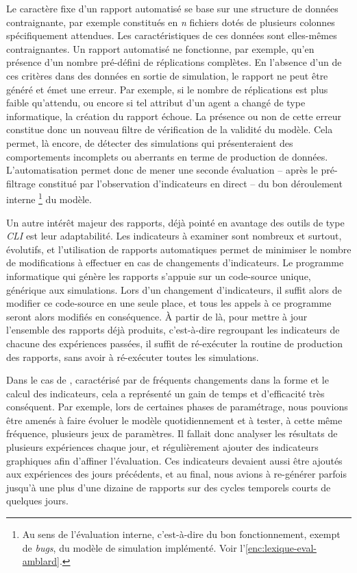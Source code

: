Le caractère fixe d'un rapport automatisé se base sur une structure de données contraignante, par exemple constitués en \textit{n} fichiers dotés de plusieurs colonnes spécifiquement attendues.
Les caractéristiques de ces données sont elles-mêmes contraignantes.
Un rapport automatisé ne fonctionne, par exemple, qu'en présence d'un nombre pré-défini de réplications complètes.
En l'absence d'un de ces critères dans des données en sortie de simulation, le rapport ne peut être généré et émet une erreur.
Par exemple, si le nombre de réplications est plus faible qu'attendu, ou encore si tel attribut d'un agent a changé de type informatique, la création du rapport échoue.
La présence ou non de cette erreur constitue donc un nouveau filtre de vérification de la validité du modèle.
Cela permet, là encore, de détecter des simulations qui présenteraient des comportements incomplets ou aberrants en terme de production de données.
L'automatisation permet donc de mener une seconde évaluation -- après le pré-filtrage constitué par l'observation d'indicateurs en direct -- du bon déroulement \og interne \fg{}\footnote{
	Au sens de l'évaluation interne, c'est-à-dire du bon fonctionnement, exempt de \textit{bugs}, du modèle de simulation implémenté.
	Voir l'\cref{enc:lexique-eval-amblard}.
} du modèle.


Un autre intérêt majeur des rapports, déjà pointé en avantage des outils de type \textit{CLI} est leur adaptabilité.
Les indicateurs à examiner sont nombreux et surtout, évolutifs, et l'utilisation de rapports automatiques permet de minimiser le nombre de modifications à effectuer en cas de changements d'indicateurs.
Le programme informatique qui génère les rapports s'appuie sur un code-source unique, générique aux simulations.
Lors d'un changement d'indicateurs, il suffit alors de modifier ce code-source en une seule place, et tous les appels à ce programme seront alors modifiés en conséquence.
À partir de là, pour mettre à jour l'ensemble des rapports déjà produits, c'est-à-dire regroupant les indicateurs de chacune des expériences passées, il suffit de ré-exécuter la routine de production des rapports, sans avoir à ré-exécuter toutes les simulations.

Dans le cas de \simfeodal{}, caractérisé par de fréquents changements dans la forme et le calcul des indicateurs, cela a représenté un gain de temps et d'efficacité très conséquent.
Par exemple, lors de certaines phases de paramétrage, nous pouvions être amenés à faire évoluer le modèle quotidiennement et à tester, à cette même fréquence, plusieurs jeux de paramètres.
Il fallait donc analyser les résultats de plusieurs expériences chaque jour, et régulièrement ajouter des indicateurs graphiques afin d'affiner l'évaluation.
Ces indicateurs devaient aussi être ajoutés aux expériences des jours précédents, et au final, nous avions à re-générer parfois jusqu'à une plus d'une dizaine de rapports sur des cycles temporels courts de quelques jours.

